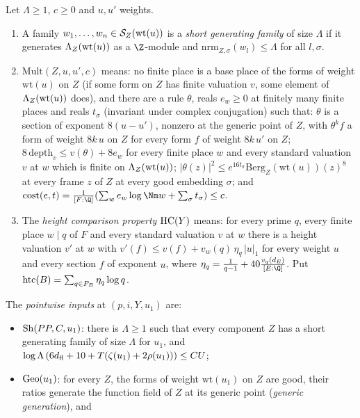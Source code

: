 \begin{definition}\label{pf:lift1:inputs}
Let $\Lambda\ge1$, $c\ge0$ and $u,u'$ weights.
\begin{enumerate}[label=(\alph*)]
\item A family $w_1,\dots,w_n\in\mathcal S_Z(\mathrm{wt}(u))$ is a \emph{short generating family} of
  size $\Lambda$ if it generates $\Lambda_Z(\mathrm{wt}(u))$ as a $\Z$-module and
  $\mathrm{nrm}_{Z,\sigma}(w_l)\le\Lambda$ for all $l,\sigma$.
\item $\mathrm{Mult}(Z,u,u',c)$ means: no finite place is a base place of the forms of weight
  $\mathrm{wt}(u)$ on $Z$ (if some form on $Z$ has finite valuation $v$, some element of
  $\Lambda_Z(\mathrm{wt}(u))$ does), and there are a rule $\theta$, reals $e_w\ge0$ at finitely many
  finite places and reals $t_\sigma$ (invariant under complex conjugation) such that: $\theta$ is a section
  of exponent $8(u-u')$, nonzero at the generic point of $Z$, with $\theta^kf$ a form of weight
  $8k\,u$ on $Z$ for every form $f$ of weight $8k\,u'$ on $Z$; $8\,\mathrm{depth}_v\le v(\theta)+8e_w$ for
  every finite place $w$ and every standard valuation $v$ at $w$ which is finite on
  $\Lambda_Z(\mathrm{wt}(u))$; $|\theta(z)|^2\le e^{16t_\sigma}\mathrm{Berg}_Z(\mathrm{wt}(u))(z)^8$ at
  every frame $z$ of $Z$ at every good embedding $\sigma$; and
  $\mathrm{cost}(e,t)=\frac1{[F:\Q]}(\sum_we_w\log\Nm w+\sum_\sigma t_\sigma)\le c$.
\item The \emph{height comparison property} $\mathrm{HC}(Y)$ means: for every prime $q$, every finite place $w\mid q$ of $F$ and every
  standard valuation $v$ at $w$ there is a height valuation $v'$ at $w$ with
  $v'(f)\le v(f)+v_w(q)\,\eta_q\,|u|_1$ for every weight $u$ and every section $f$ of exponent
  $u$, where $\eta_q=\frac1{q-1}+40\frac{v_q(d_E)}{[E:\Q]}$. Put
  $\mathrm{htc}(B)=\sum_{q\in P_B}\eta_q\log q$.
\end{enumerate}
The \emph{pointwise inputs} at $(p,i,Y,u_1)$ are:
\begin{itemize}
\item $\mathrm{Sh}(PP,C,u_1)$: there is $\Lambda\ge1$ such that every component $Z$ has a short
  generating family of size $\Lambda$ for $u_1$, and
  $\log\Lambda\,(6d_{\mathrm{fl}}+10+T(\zeta(u_1)+2\rho(u_1)))\le CU$;
\item $\mathrm{Geo}(u_1)$: for every $Z$, the forms of weight $\mathrm{wt}(u_1)$ on $Z$ are good,
  their ratios generate the function field of $Z$ at its generic point (\emph{generic generation}), and

\end{itemize}
\end{definition}
